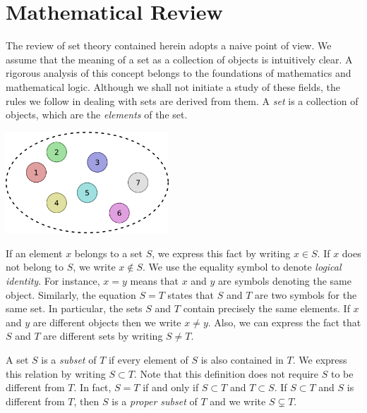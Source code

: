 \chapter{Mathematical Review}

The review of set theory contained herein adopts a naive point of view.
We assume that the meaning of a set as a collection of objects is intuitively clear.
A rigorous analysis of this concept belongs to the foundations of mathematics and mathematical logic.
Although we shall not initiate a study of these fields, the rules we follow in dealing with sets are derived from them.
A \emph{set} is a collection of objects, which are the \emph{elements} of the set.

\begin{center}
\includegraphics[height=3.825cm]{Figures/1Chapter/basicset}
\end{center}

If an element $x$ belongs to a set $S$, we express this fact by writing $x \in S$.
If $x$ does not belong to $S$, we write $x \notin S$.
We use the equality symbol to denote \emph{logical identity}.
For instance, $x = y$ means that $x$ and $y$ are symbols denoting the same object.
Similarly, the equation $S = T$ states that $S$ and $T$ are two symbols for the same set.
In particular, the sets $S$ and $T$ contain precisely the same elements.
If $x$ and $y$ are different objects then we write $x \neq y$.
Also, we can express the fact that $S$ and $T$ are different sets by writing $S \neq T$.

A set $S$ is a \emph{subset} of $T$ if every element of $S$ is also contained in $T$.
We express this relation by writing $S \subset T$.
Note that this definition does not require $S$ to be different from $T$.
In fact, $S = T$ if and only if $S \subset T$ and $T \subset S$.
If $S \subset T$ and $S$ is different from $T$, then $S$ is a \emph{proper subset} of $T$ and we write $S \subsetneq T$.

